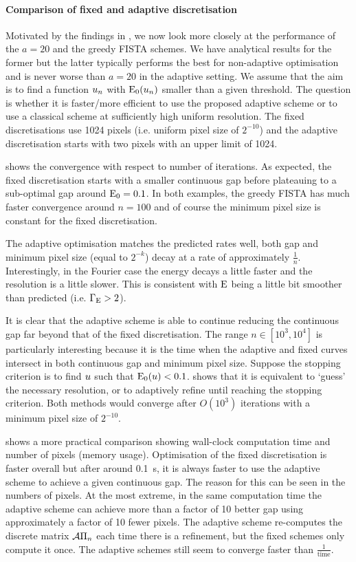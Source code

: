 \documentclass[10pt,a4paper,onecolumn]{article}
\numberwithin{equation}{section}
\newcommand{\op}[1]{\operatorname{#1}}\newcommand{\overtext}[2]{\stackrel{\text{#1}}{#2}}
\newcommand*{\Func}[1]{%
	\IfEqCase{#1}{%
		{0}{\op{E}}%
		{1}{\op{F}}%
		{2}{\op{G}}%
		{3}{\op{H}}%
	}[\op{F}#1]%
}
\newcommand*{\varf}[1]{%
	\IfEqCase{#1}{%
		{0}{u}%
		{1}{v}%
		{2}{w}%
	}[u#1]%
}
\newcommand*{\vars}[1]{%
	\IfEqCase{#1}{%
		{0}{\alpha}%
		{1}{\beta}%
		{2}{\gamma}%
		{3}{a}%
		{4}{b}%
		{5}{c}%
	}[k#1]%
}
\begin{document}
\paragraph{Comparison of fixed and adaptive discretisation}
Motivated by the findings in , we now look more closely at the performance of the $a=20$ and the greedy FISTA schemes. We have analytical results for the former but the latter typically performs the best for non-adaptive optimisation and is never worse than $a=20$ in the adaptive setting. We assume that the aim is to find a function $\varf0_n$ with $\Func0_0(\varf0_n)$ smaller than a given threshold. The question is whether it is faster/more efficient to use the proposed adaptive scheme or to use a classical scheme at sufficiently high uniform resolution. The fixed discretisations use 1024 pixels (i.e. uniform pixel size of $2^{-10}$) and the adaptive discretisation starts with two pixels with an upper limit of 1024. 

 shows the convergence with respect to number of iterations. As expected, the fixed discretisation starts with a smaller continuous gap before plateauing to a sub-optimal gap around $\Func0_0=0.1$. In both examples, the greedy FISTA has much faster convergence around $n=100$ and of course the minimum pixel size is constant for the fixed discretisation. 

The adaptive optimisation matches the predicted rates well, both gap and minimum pixel size (equal to $2^{-k}$) decay at a rate of approximately $\frac1n$. Interestingly, in the Fourier case the energy decays a little faster and the resolution is a little slower. This is consistent with $\Func0$ being a little bit smoother than predicted (i.e. $\vars2_{\Func0}>2$). 

It is clear that the adaptive scheme is able to continue reducing the continuous gap far beyond that of the fixed discretisation. The range $n\in[10^3,10^4]$ is particularly interesting because it is the time when the adaptive and fixed curves intersect in both continuous gap and minimum pixel size. Suppose the stopping criterion is to find $\varf0$ such that $\Func0_0(\varf0)<0.1$.  shows that it is equivalent to `guess' the necessary resolution, or to adaptively refine until reaching the stopping criterion. Both methods would converge after $O(10^3)$ iterations with a minimum pixel size of $2^{-10}$.

 shows a more practical comparison showing wall-clock computation time and number of pixels (memory usage). Optimisation of the fixed discretisation is faster overall but after around \SI{0.1}{\second}, it is always faster to use the adaptive scheme to achieve a given continuous gap. The reason for this can be seen in the numbers of pixels. At the most extreme, in the same computation time the adaptive scheme can achieve more than a factor of 10 better gap using approximately a factor of 10 fewer pixels. The adaptive scheme re-computes the discrete matrix $\mathcal{A}\Pi_n$ each time there is a refinement, but the fixed schemes only compute it once. The adaptive schemes still seem to converge faster than $\frac1{\op{time}}$.
\end{document}
